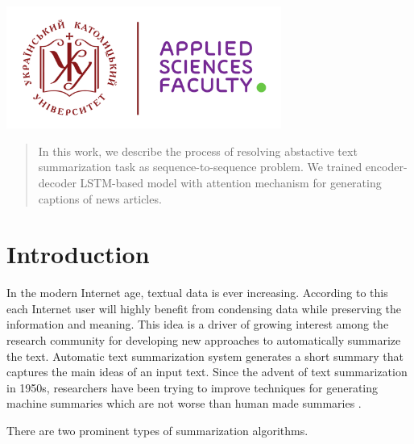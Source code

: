 \begin{titlepage}

\includegraphics[height=4cm]{img/UCU-Apps.png}\\[1cm] %
 

\vfill %

\end{titlepage}


\begin{abstract}
In this work, we describe the process of resolving abstactive text summarization task as sequence-to-sequence problem. We trained encoder-decoder LSTM-based model with attention mechanism for generating captions of news articles. 
\end{abstract}

\section{Introduction}

In the modern Internet age, textual data is ever increasing. According to this each Internet user will highly benefit from condensing data while preserving the information and meaning. This idea is a driver of growing interest among the research community for developing new approaches to automatically summarize the text. Automatic text summarization system generates a short summary that captures the main ideas
of an input text. Since the advent of text summarization in 1950s, researchers have been trying to improve techniques for generating machine summaries which are not worse than human made summaries \cite{text_sum_survey}.
  
There are two prominent types of summarization algorithms.


